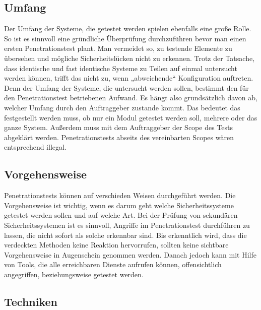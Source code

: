 \subsection{Umfang}

Der Umfang der Systeme, die getestet werden spielen ebenfalls eine große Rolle. So ist es sinnvoll eine gründliche Überprüfung durchzuführen bevor man einen ersten Penetrationstest plant. Man vermeidet so, zu testende Elemente zu übersehen und mögliche Sicherheitslücken nicht zu erkennen. Trotz der Tatsache, dass identische und fast identische Systeme zu Teilen auf einmal untersucht werden können, trifft das nicht zu, wenn „abweichende“ Konfiguration auftreten. Denn der Umfang der Systeme, die untersucht werden sollen, bestimmt den für den Penetrationstest betriebenen Aufwand. Es hängt also grundsätzlich davon ab, welcher Umfang durch den Auftraggeber zustande kommt. Das bedeutet das festgestellt werden muss, ob nur ein Modul getestet werden soll, mehrere oder das ganze System. Außerdem muss mit dem Auftraggeber der Scope des Tests abgeklärt werden. Penetrationstests abseits des vereinbarten Scopes wären entsprechend illegal\cite[14--15]{pt03bsi}.

\subsection{Vorgehensweise}

Penetrationstests können auf verschieden Weisen durchgeführt werden. Die Vorgehensweise ist wichtig, wenn es darum geht welche Sicherheitssysteme getestet werden sollen und auf welche Art. Bei der Prüfung von sekundären Sicherheitssystemen ist es sinnvoll, Angriffe im Penetrationstest durchführen zu lassen, die nicht sofort als solche erkennbar sind. Bis erkenntlich wird, dass die verdeckten Methoden keine Reaktion hervorrufen, sollten keine sichtbare Vorgehensweise in Augenschein genommen werden. Danach jedoch kann mit Hilfe von Tools, die alle erreichbaren Dienste aufrufen können, offensichtlich angegriffen, beziehungsweise getestet werden\cite[15]{pt03bsi}. 

\subsection{Techniken}

